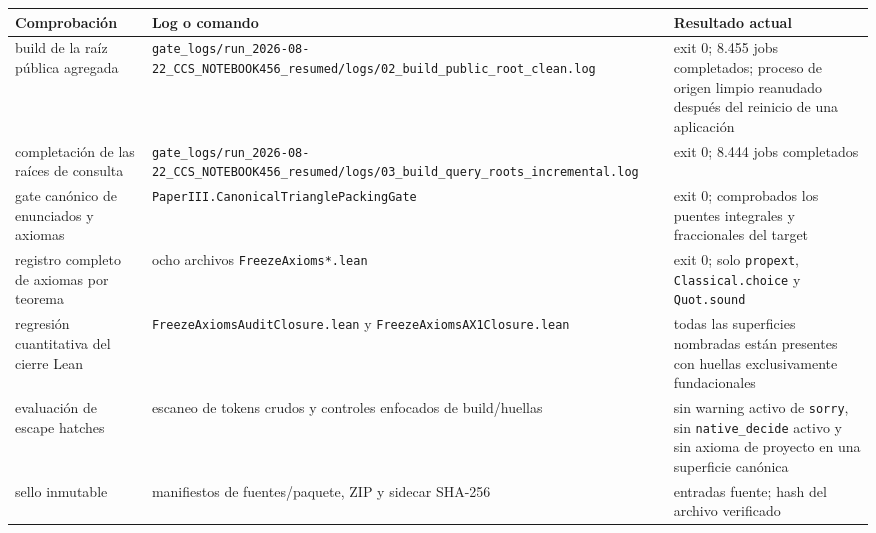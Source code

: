 \documentclass[
  spanish,
  11pt,
  a4paper,
]{article}
\newcounter{none} %
\begin{document}
{\def\LTcaptype{none} %
\begin{longtable}[]{@{}
  >{\raggedright\arraybackslash}p{}
  >{\raggedright\arraybackslash}p{}
  >{\raggedright\arraybackslash}p{}@{}}
\toprule\noalign{}
\begin{minipage}[b]{\linewidth}\raggedright
Comprobación
\end{minipage} & \begin{minipage}[b]{\linewidth}\raggedright
Log o comando
\end{minipage} & \begin{minipage}[b]{\linewidth}\raggedright
Resultado actual
\end{minipage} \\
\midrule\noalign{}
\endhead
\bottomrule\noalign{}
\endlastfoot
build de la raíz pública agregada & \texttt{gate\_logs/run\_2026-08-22\_CCS\_NOTEBOOK456\_resumed/logs/02\_build\_public\_root\_clean.log} & exit 0; 8.455 jobs completados; proceso de origen limpio reanudado después del reinicio de una aplicación \\
completación de las raíces de consulta & \texttt{gate\_logs/run\_2026-08-22\_CCS\_NOTEBOOK456\_resumed/logs/03\_build\_query\_roots\_incremental.log} & exit 0; 8.444 jobs completados \\
gate canónico de enunciados y axiomas & \texttt{PaperIII.CanonicalTrianglePacking\allowbreak{}Gate} & exit 0; comprobados los puentes integrales y fraccionales del target \\
registro completo de axiomas por teorema & ocho archivos \texttt{FreezeAxioms*.lean} & exit 0; solo \texttt{propext}, \texttt{Classical.choice} y \texttt{Quot.sound} \\
regresión cuantitativa del cierre Lean & \texttt{FreezeAxiomsAuditClosure.lean} y \texttt{FreezeAxiomsAX1Closure.lean} & todas las superficies nombradas están presentes con huellas exclusivamente fundacionales \\
evaluación de escape hatches & escaneo de tokens crudos y controles enfocados de build/huellas & sin warning activo de \texttt{sorry}, sin \texttt{native\_decide} activo y sin axioma de proyecto en una superficie canónica \\
sello inmutable & manifiestos de fuentes/paquete, ZIP y sidecar SHA-256 & 707 entradas fuente; hash del archivo verificado \\
\end{longtable}
}
\end{document}

